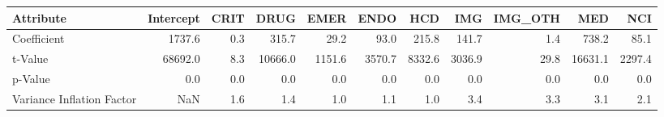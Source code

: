 \begin{tabular}{lrrrrrrrrrr}
\toprule
Attribute &  Intercept &  CRIT &     DRUG &    EMER &    ENDO &     HCD &     IMG &  IMG\_OTH &      MED &     NCI \\
\midrule
Coefficient               &     1737.6 &   0.3 &    315.7 &    29.2 &    93.0 &   215.8 &   141.7 &      1.4 &    738.2 &    85.1 \\
t-Value                   &    68692.0 &   8.3 &  10666.0 &  1151.6 &  3570.7 &  8332.6 &  3036.9 &     29.8 &  16631.1 &  2297.4 \\
p-Value                   &        0.0 &   0.0 &      0.0 &     0.0 &     0.0 &     0.0 &     0.0 &      0.0 &      0.0 &     0.0 \\
Variance Inflation Factor &        NaN &   1.6 &      1.4 &     1.0 &     1.1 &     1.0 &     3.4 &      3.3 &      3.1 &     2.1 \\
\bottomrule
\end{tabular}
